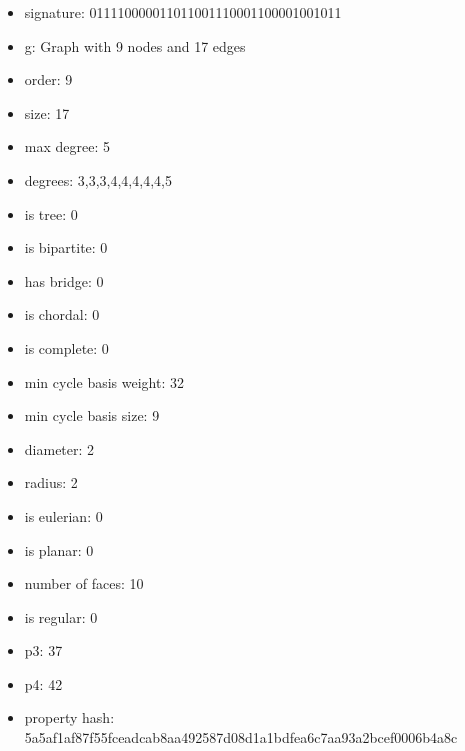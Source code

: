 \newpage
\begin{figure}
\end{figure}
\begin{itemize}
\item signature: 011110000011011001110001100001001011
\item g: Graph with 9 nodes and 17 edges
\item order: 9
\item size: 17
\item max degree: 5
\item degrees: 3,3,3,4,4,4,4,4,5
\item is tree: 0
\item is bipartite: 0
\item has bridge: 0
\item is chordal: 0
\item is complete: 0
\item min cycle basis weight: 32
\item min cycle basis size: 9
\item diameter: 2
\item radius: 2
\item is eulerian: 0
\item is planar: 0
\item number of faces: 10
\item is regular: 0
\item p3: 37
\item p4: 42
\item property hash: 5a5af1af87f55fceadcab8aa492587d08d1a1bdfea6c7aa93a2bcef0006b4a8c
\end{itemize}
